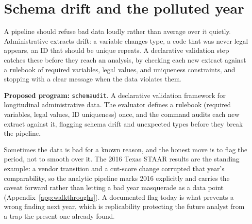 \documentclass[
    a4paper,
    fontsize=10pt,
    twoside=true,
    numbers=noenddot,
]{kaobook}
\begin{document}
\section{Schema drift and the polluted year}
A pipeline should refuse bad data loudly rather than average over it quietly. Administrative extracts drift: a variable changes type, a code that was never legal appears, an ID that should be unique repeats. A declarative validation step catches these before they reach an analysis, by checking each new extract against a rulebook of required variables, legal values, and uniqueness constraints, and stopping with a clear message when the data violates them.

\begin{kaobox}[frametitle=Ado-file Idea: \texttt{schemaudit}]
\textbf{Proposed program:} \texttt{schemaudit}. A declarative validation framework for longitudinal administrative data. The evaluator defines a rulebook (required variables, legal values, ID uniqueness) once, and the command audits each new extract against it, flagging schema drift and unexpected types before they break the pipeline.
\end{kaobox}

Sometimes the data is bad for a known reason, and the honest move is to flag the period, not to smooth over it. The 2016 Texas STAAR results are the standing example: a vendor transition and a cut-score change corrupted that year's comparability, so the analytic pipeline marks 2016 explicitly and carries the caveat forward rather than letting a bad year masquerade as a data point (Appendix~\ref{app:walkthroughs}). A documented flag today is what prevents a wrong finding next year, which is replicability protecting the future analyst from a trap the present one already found.
\end{document}
